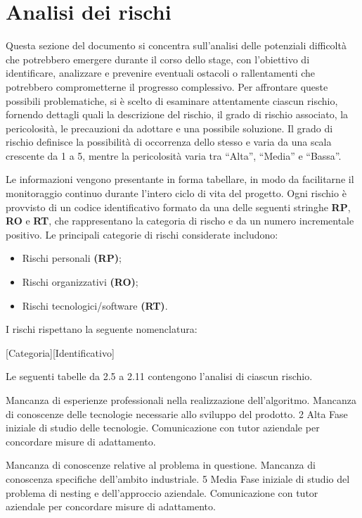\section{Analisi dei rischi}

Questa sezione del documento si concentra sull’analisi delle potenziali difficoltà che potrebbero emergere durante il corso dello stage, con l’obiettivo di identificare, analizzare e prevenire eventuali ostacoli o rallentamenti che potrebbero comprometterne il progresso complessivo. Per affrontare queste possibili problematiche, si è scelto di esaminare attentamente ciascun rischio, fornendo dettagli quali la descrizione del rischio, il grado di rischio associato, la pericolosità, le precauzioni da adottare e una possibile soluzione. Il grado di rischio definisce la possibilità di occorrenza dello stesso e varia da una scala crescente da 1 a 5, mentre la pericolosità varia tra “Alta”, “Media” e “Bassa”. 

Le informazioni vengono presentante in forma tabellare, in modo da facilitarne il monitoraggio continuo durante l’intero ciclo di vita del progetto. Ogni rischio è provvisto di un codice identificativo formato da una delle seguenti stringhe \textbf{RP}, \textbf{RO} e \textbf{RT}, che rappresentano la categoria di rischo e da un numero incrementale positivo. Le principali categorie di rischi considerate includono:
\begin{itemize}
    \item Rischi personali \textbf{(RP)};
    \item Rischi organizzativi \textbf{(RO)};
    \item Rischi tecnologici/software \textbf{(RT)}.
\end{itemize}
I rischi rispettano la seguente nomenclatura:
\begin{center}
    [Categoria][Identificativo]
\end{center}

Le seguenti tabelle da 2.5 a 2.11 contengono l'analisi di ciascun rischio.

{Mancanza di esperienze professionali nella realizzazione dell'algoritmo. Mancanza di conoscenze delle tecnologie necessarie allo sviluppo del prodotto.}
{2}
{Alta}
{Fase iniziale di studio delle tecnologie.}
{Comunicazione con tutor aziendale per concordare misure di adattamento.}

{Mancanza di conoscenze relative al problema in questione. Mancanza di conoscenza specifiche dell'ambito industriale.}
{5}
{Media}
{Fase iniziale di studio del problema di nesting e dell'approccio aziendale.}
{Comunicazione con tutor aziendale per concordare misure di adattamento.}

